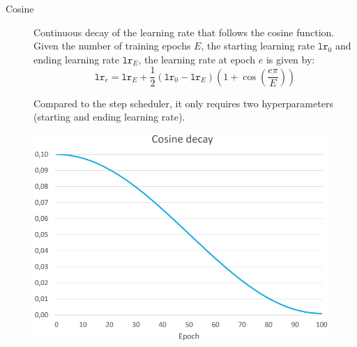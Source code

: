 \begin{minipage}{0.6\linewidth}
    \begin{description}
        \item[Cosine]
            Continuous decay of the learning rate that follows the cosine function.
            Given the number of training epochs $E$, the starting learning rate $\texttt{lr}_0$ and ending learning rate $\texttt{lr}_E$, the learning rate at epoch $e$ is given by:
            \[ \texttt{lr}_e = \texttt{lr}_E + \frac{1}{2}(\texttt{lr}_0 - \texttt{lr}_E) \left( 1 + \cos\left( \frac{e\pi}{E} \right) \right) \]

            \begin{remark}
                Compared to the step scheduler, it only requires two hyperparameters (starting and ending learning rate).
            \end{remark}
    \end{description}
\end{minipage}
\begin{minipage}{0.35\linewidth}
    \begin{figure}[H]
        \centering
        \includegraphics[width=0.9\linewidth]{./img/lr_schedule_cosine.png}
    \end{figure}
\end{minipage}

